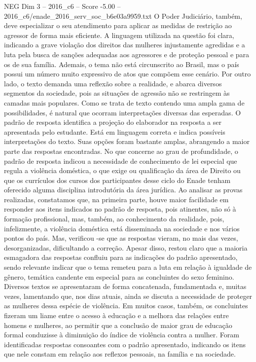 \begin{textsample}{NEG Dim 3 – 2016\_c6 – Score -5.00 – 2016\_c6/enade\_2016\_serv\_soc\_b6e03a9959.txt}
O Poder Judiciário, também, deve especializar o seu atendimento para aplicar as medidas de restrição ao agressor de forma mais eficiente.
A linguagem utilizada na questão foi clara, indicando a grave violação dos direitos das mulheres injustamente agredidas e a luta pela busca de sanções adequadas aos agressores e de proteção pessoal e para os de sua família.
Ademais, o tema não está circunscrito ao Brasil, mas o país possui um número muito expressivo de atos que compõem esse cenário.
Por outro lado, o texto demanda uma reflexão sobre a realidade, e abarca diversos segmentos da sociedade, pois as situações de agressão não se restringem às camadas mais populares.
Como se trata de texto contendo uma ampla gama de possibilidades, é natural que ocorram interpretações diversas das esperadas.
O padrão de resposta identifica a projeção do elaborador na resposta a ser apresentada pelo estudante.
Está em linguagem correta e indica possíveis interpretações do texto.
Suas opções foram bastante amplas, abrangendo a maior parte das respostas encontradas.
No que concerne ao grau de profundidade, o padrão de resposta indicou a necessidade de conhecimento de lei especial que regula a violência doméstica, o que exige ou qualificação da área de Direito ou que os currículos dos cursos dos participantes desse ciclo do Enade tenham oferecido alguma disciplina introdutória da área jurídica.
Ao analisar as provas realizadas, constatamos que, na primeira parte, houve maior facilidade em responder aos itens indicados no padrão de resposta, pois atinentes, não só à formação profissional, mas, também, ao conhecimento da realidade, pois, infelizmente, a violência doméstica está disseminada na sociedade e nos vários pontos do país.
Mas, verificou -se que as respostas vieram, no mais das vezes, desorganizadas, dificultando a correção.
Apesar disso, restou claro que a maioria esmagadora das respostas confluiu para as indicações do padrão apresentado, sendo relevante indicar que o tema remeteu para a luta em relação à igualdade de gênero, temática candente em especial para as concluintes do sexo feminino.
Diversos textos se apresentaram de forma concatenada, fundamentada e, muitas vezes, lamentando que, nos dias atuais, ainda se discuta a necessidade de proteger as mulheres dessa espécie de violência.
Em muitos casos, também, os concluintes fizeram um liame entre o acesso à educação e a melhora das relações entre homens e mulheres, ao permitir que a conclusão de maior grau de educação formal conduzisse à diminuição do índice de violência contra a mulher.
Foram identificadas respostas consoantes com o padrão apresentado, indicando os itens que nele constam em relação aos reflexos pessoais, na família e na sociedade.

\end{textsample}
